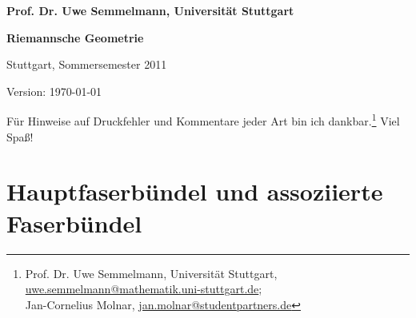 \documentclass[%
	paper=a5,%
	fleqn,%
	DIV=18,%
	BCOR=0mm,
	fontsize=11pt,
	titlepage=false,%
	bibliography=totoc,
	DIV=18,%
	twoside=true,
	pdftitle=Riemannsche Geometrie,
	pdfauthor=Uwe Semmelmann,
	numbers=noendperiod]%
	{scrbook}
\begin{document}

\begin{titlepage}
\vspace*{2mm}
\noindent\bf\color{gdarkgray}
Prof. Dr. Uwe Semmelmann, Universität Stuttgart

\begin{center}
\vspace*{10mm}
{\noindent\huge\bf\color{darkblue} Riemannsche Geometrie}

\vspace*{4mm}

Stuttgart, Sommersemester 2011
\end{center}

\vspace*{\fill}

\begin{flushright}
\small
Version: \today\
\vspace*{5mm}

Für Hinweise auf Druckfehler und Kommentare jeder Art bin ich 
dankbar.\footnote{\color{gdarkgray}
Prof. Dr. Uwe Semmelmann, Universität Stuttgart,
\href{mailto:uwe.semmelmann@mathematik.uni-stuttgart.de}{uwe.semmelmann@mathematik.uni-stuttgart.de};\\
Jan-Cornelius Molnar,
\href{mailto:jan.molnar@studentpartners.de}{jan.molnar@studentpartners.de}}
Viel Spaß!
\end{flushright}
\end{titlepage}


\tableofcontents

\fancyhead[RO]{\footnotesize\color{gdarkgray}%
	\marginnote{$\Big|$\;\textbf{\thesection}}\rightmark}
\fancyhead[LE]{\footnotesize\color{gdarkgray}%
	\marginnote{\;\textbf{\thechapter}$\Big|$}\leftmark}

\fancyfoot[LE]{\footnotesize\color{gdarkgray}%
 	\thepage}%
 \fancyfoot[RO]{\footnotesize\color{gdarkgray}%
 	\thepage}%
 \fancyfoot[RE,LO]{\tiny\color{gdarkgray}\today}




\chapter{Hauptfaserbündel und assoziierte Faserbündel}
\end{document}
